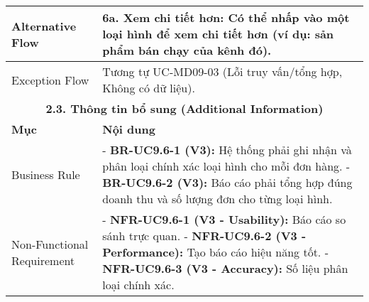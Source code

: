 \begin{longtable}{|m{4cm}|p{11cm}|}
\hline
Alternative Flow & \textbf{6a. Xem chi tiết hơn:} Có thể nhấp vào một loại hình để xem chi tiết hơn (ví dụ: sản phẩm bán chạy của kênh đó). \\
\hline
Exception Flow & Tương tự UC-MD09-03 (Lỗi truy vấn/tổng hợp, Không có dữ liệu). \\
\hline
\multicolumn{2}{|c|}{\textbf{2.3. Thông tin bổ sung (Additional Information)}} \\
\hline
\textbf{Mục} & \textbf{Nội dung} \\
\hline
Business Rule & - \textbf{BR-UC9.6-1 (V3):} Hệ thống phải ghi nhận và phân loại chính xác loại hình cho mỗi đơn hàng. \newline - \textbf{BR-UC9.6-2 (V3):} Báo cáo phải tổng hợp đúng doanh thu và số lượng đơn cho từng loại hình. \\
\hline
Non-Functional Requirement & - \textbf{NFR-UC9.6-1 (V3 - Usability):} Báo cáo so sánh trực quan. \newline - \textbf{NFR-UC9.6-2 (V3 - Performance):} Tạo báo cáo hiệu năng tốt. \newline - \textbf{NFR-UC9.6-3 (V3 - Accuracy):} Số liệu phân loại chính xác. \\
\hline
\end{longtable}

